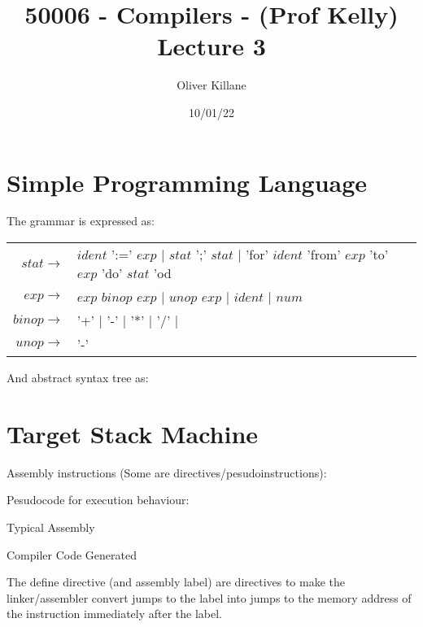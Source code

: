 \documentclass{report}
\title{50006 - Compilers - (Prof Kelly) Lecture 3}
\author{Oliver Killane}
\date{10/01/22}
\begin{document}
\maketitle
{}

\section*{Simple Programming Language}
The grammar is expressed as:
\begin{center}
	\begin{tabular}{r l}
		$stat \to$  & $ident$ ':=' $exp$ $|$ $stat$ ';' $stat$ $|$ 'for' $ident$ 'from' $exp$ 'to' $exp$ 'do' $stat$ 'od \\
		$exp \to$   & $exp$ $binop$ $exp$ $|$ $unop$ $exp$ $|$ $ident$ $|$ $num$                                         \\
		$binop \to$ & '+' $|$ '-' $|$ '*' $|$ '/' $|$                                                                    \\
		$unop \to$  & '-'                                                                                                \\
	\end{tabular}
\end{center}

And abstract syntax tree as:

\section*{Target Stack Machine}
Assembly instructions (Some are directives/pesudoinstructions):

Pesudocode for execution behaviour:

\begin{minipage}[t]{0.4\textwidth}
	\centerline{Typical Assembly}
\end{minipage}
\hfill
\begin{minipage}[t]{0.4\textwidth}
	\centerline{Compiler Code Generated}
\end{minipage}
The define directive (and assembly label) are directives to make the linker/assembler convert jumps to the label into jumps to the memory address of the instruction immediately after the label.
\end{document}
